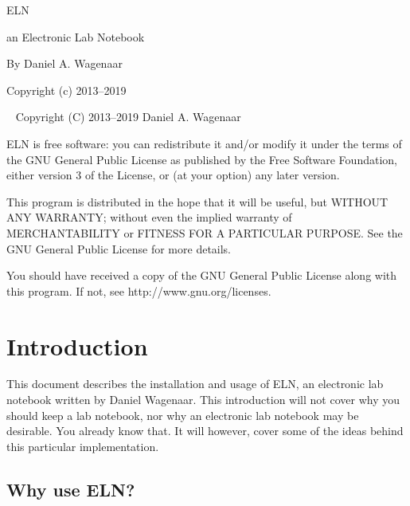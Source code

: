 \documentclass[11pt]{report}
\begin{document}
\thispagestyle{empty}
\begin{centering}
  {\Huge ELN}
  \vskip30pt

  {\Large an Electronic Lab Notebook}
  \vskip60pt

  {\large By Daniel A. Wagenaar}
  \vfill
  
  {Copyright (c) 2013--2019}
  
\end{centering}
\pagebreak
~
\vfill
\noindent Copyright (C) 2013--2019 Daniel A. Wagenaar\medskip

ELN is free software: you can redistribute it and/or modify
it under the terms of the GNU General Public License as published by
the Free Software Foundation, either version 3 of the License, or
(at your option) any later version.

This program is distributed in the hope that it will be useful,
but WITHOUT ANY WARRANTY; without even the implied warranty of
MERCHANTABILITY or FITNESS FOR A PARTICULAR PURPOSE.  See the
GNU General Public License for more details.

You should have received a copy of the GNU General Public License
along with this program.  If not, see http://www.gnu.org/licenses.
\pagebreak

\chapter{Introduction}

This document describes the installation and usage of ELN, an
electronic lab notebook written by Daniel Wagenaar.  This introduction
will not cover why you should keep a lab notebook, nor why an
electronic lab notebook may be desirable. You already know that.  It
will however, cover some of the ideas behind this particular
implementation.

\section{Why use ELN?}
\end{document}
